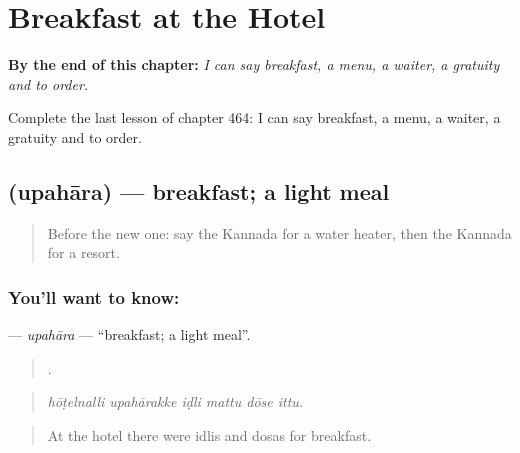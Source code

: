 
\chapter{Breakfast at the Hotel}
\label{ch:ka-breakfast-at-the-hotel}

\begin{chapteropening}
\textbf{By the end of this chapter:} \emph{I can say breakfast, a menu, a waiter, a gratuity and to order.}

Complete the last lesson of chapter 464: I can say breakfast, a menu, a waiter, a gratuity and to order.
\end{chapteropening}

\section[\texorpdfstring{\kn{ಉಪಹಾರ} (upahāra)}{ಉಪಹಾರ (upahāra)}]{ (upahāra) — breakfast; a light meal}

\label{lesson:KA-C464-upahara}



\begin{quote}
Before the new one: say the Kannada for a water heater, then the Kannada for a resort.
\end{quote}

\subsection*{You'll want to know: }
\textbf{} — \emph{upahāra} — \textquotedblleft{}breakfast; a light meal\textquotedblright{}.

\begin{quote}
     .
\end{quote}

\begin{quote}
\emph{hōṭelnalli upahārakke iḍli mattu dōse ittu.}
\end{quote}

\begin{quote}
At the hotel there were idlis and dosas for breakfast.
\end{quote}

